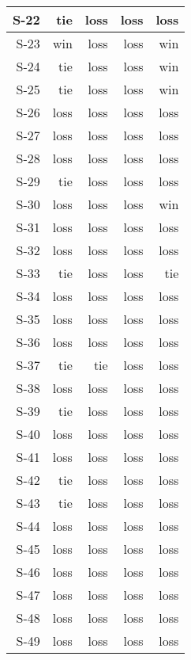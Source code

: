 \begin{tabular}{ | r | r | r | r | r | }
    \hline
         S-22  &    tie  &   loss  &   loss  &   loss  \\
    \hline
         S-23  &    win  &   loss  &   loss  &    win  \\
    \hline
         S-24  &    tie  &   loss  &   loss  &    win  \\
    \hline
         S-25  &    tie  &   loss  &   loss  &    win  \\
    \hline
         S-26  &   loss  &   loss  &   loss  &   loss  \\
    \hline
         S-27  &   loss  &   loss  &   loss  &   loss  \\
    \hline
         S-28  &   loss  &   loss  &   loss  &   loss  \\
    \hline
         S-29  &    tie  &   loss  &   loss  &   loss  \\
    \hline
         S-30  &   loss  &   loss  &   loss  &    win  \\
    \hline
         S-31  &   loss  &   loss  &   loss  &   loss  \\
    \hline
         S-32  &   loss  &   loss  &   loss  &   loss  \\
    \hline
         S-33  &    tie  &   loss  &   loss  &    tie  \\
    \hline
         S-34  &   loss  &   loss  &   loss  &   loss  \\
    \hline
         S-35  &   loss  &   loss  &   loss  &   loss  \\
    \hline
         S-36  &   loss  &   loss  &   loss  &   loss  \\
    \hline
         S-37  &    tie  &    tie  &   loss  &   loss  \\
    \hline
         S-38  &   loss  &   loss  &   loss  &   loss  \\
    \hline
         S-39  &    tie  &   loss  &   loss  &   loss  \\
    \hline
         S-40  &   loss  &   loss  &   loss  &   loss  \\
    \hline
         S-41  &   loss  &   loss  &   loss  &   loss  \\
    \hline
         S-42  &    tie  &   loss  &   loss  &   loss  \\
    \hline
         S-43  &    tie  &   loss  &   loss  &   loss  \\
    \hline
         S-44  &   loss  &   loss  &   loss  &   loss  \\
    \hline
         S-45  &   loss  &   loss  &   loss  &   loss  \\
    \hline
         S-46  &   loss  &   loss  &   loss  &   loss  \\
    \hline
         S-47  &   loss  &   loss  &   loss  &   loss  \\
    \hline
         S-48  &   loss  &   loss  &   loss  &   loss  \\
    \hline
         S-49  &   loss  &   loss  &   loss  &   loss  \\
    \hline
\end{tabular}


